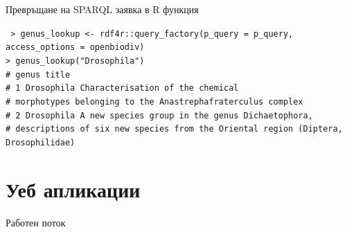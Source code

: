 \documentclass[bulgarian]{beamer}
\begin{document}
\begin{frame}{Превръщане на SPARQL заявка в R функция}

\tt
> genus\_lookup <- rdf4r::query\_factory(p\_query = p\_query, access\_options = openbiodiv)\\
> genus\_lookup("Drosophila")\\
#    genus title\\
# 1   Drosophila  Characterisation of the chemical\\
# morphotypes belonging to the Anastrephafraterculus complex\\
# 2   Drosophila                A new species group in the genus Dichaetophora,\\
# descriptions of six new species from the Oriental region (Diptera, Drosophilidae)
\end{frame}

\section{Уеб апликации}

\begin{frame}{Работен поток}
\centering
{}

\end{frame}
\end{document}
